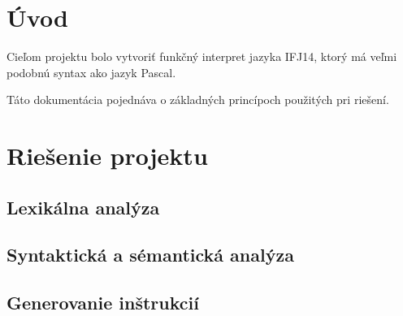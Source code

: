 \documentclass[12pt,a4paper,titlepage,final]{article}
\begin{document}

\def\author{TODO}
\def\email{xloginXX@stud.fit.vutbr.cz}
\def\projname{Interpret jazyka IFJ14}



\pagestyle{plain}
\setcounter{page}{1}
\tableofcontents

\listoftodos[Notes]

\newpage
\pagestyle{plain}
\setcounter{page}{1}

\section{Úvod} \label{uvod}

Cieľom projektu bolo vytvoriť funkčný interpret jazyka IFJ14, ktorý má veľmi
 podobnú syntax ako jazyk Pascal.

Táto dokumentácia pojednáva o základných princípoch použitých pri riešení.


\section{Riešenie projektu} \label{riesenie}

\subsection{Lexikálna analýza}

\subsection{Syntaktická a sémantická analýza}

\subsection{Generovanie inštrukcií}
\end{document}
